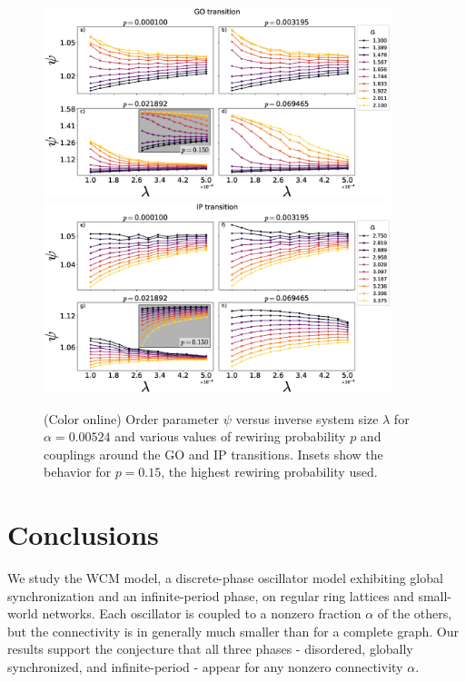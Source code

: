 \begin{figure}
\begin{center}
    \includegraphics[width=0.9\textwidth]{fig/opsplit-psi-GOT-pvalue.eps}
    \includegraphics[width=0.9\textwidth]{fig/opsplit-psi-IPT-pvalue.eps}
\caption{\label{fig:pvalue} (Color online) Order parameter $\psi$ versus inverse system size $\lambda$ for $\alpha=0.00524$ and various
values of rewiring probability $p$ and couplings around the GO and IP transitions. Insets show the behavior for $p=0.15$, the highest
rewiring probability used.}
\end{center}
\end{figure}

\clearpage


\section{\label{conclusions}Conclusions}


We study the WCM model, a discrete-phase oscillator model exhibiting global synchronization and an infinite-period phase, on regular
ring lattices and small-world networks.  Each oscillator is coupled to a nonzero fraction $\alpha$ of the others, but the connectivity
is in generally much smaller than for a complete graph.  Our results support the conjecture that all three phases - disordered,
globally synchronized, and infinite-period - appear for any nonzero connectivity $\alpha$. 

